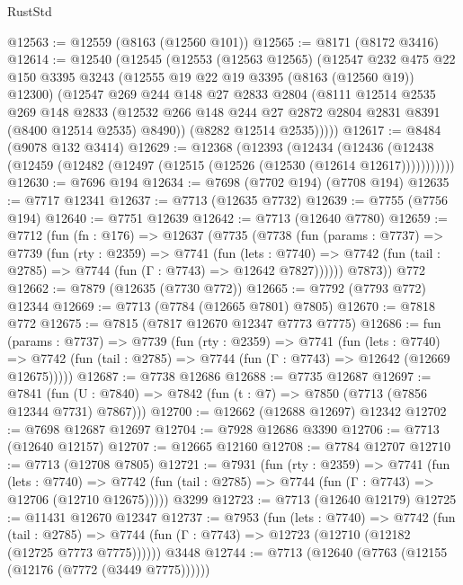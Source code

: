 \begin{lexlean}{RustStd}
\begin{coremodule}
@12563 := @12559 (@8163 (@12560 @101))
@12565 := @8171 (@8172 @3416)
@12614 := @12540
    (@12545
      (@12553
        (@12563 @12565)
        (@12547
          @232
          @475
          @22
          @150
          @3395
          @3243
          (@12555 @19 @22 @19 @3395 (@8163 (@12560 @19)) @12300)
          (@12547
            @269
            @244
            @148
            @27
            @2833
            @2804
            (@8111
              @12514
              @2535
              @269
              @148
              @2833
              (@12532 @266 @148 @244 @27 @2872 @2804 @2831 @8391 (@8400 @12514 @2535) @8490))
            (@8282 @12514 @2535)))))
@12617 := @8484 (@9078 @132 @3414)
@12629 := @12368
    (@12393
      (@12434
        (@12436 (@12438 (@12459 (@12482 (@12497 (@12515 (@12526 (@12530 (@12614 @12617)))))))))))
@12630 := @7696 @194
@12634 := @7698 (@7702 @194) (@7708 @194)
@12635 := @7717 @12341
@12637 := @7713 (@12635 @7732)
@12639 := @7755 (@7756 @194)
@12640 := @7751 @12639
@12642 := @7713 (@12640 @7780)
@12659 := @7712
    (fun (fn : @176) =>
    @12637
      (@7735
        (@7738
          (fun (params : @7737) =>
          @7739
            (fun (rty : @2359) =>
            @7741
              (fun (lets : @7740) =>
              @7742 (fun (tail : @2785) => @7744 (fun (Γ : @7743) => @12642 @7827))))))
        @7873))
    @772
@12662 := @7879 (@12635 (@7730 @772))
@12665 := @7792 (@7793 @772) @12344
@12669 := @7713 (@7784 (@12665 @7801) @7805)
@12670 := @7818 @772
@12675 := @7815 (@7817 @12670 @12347 @7773 @7775)
@12686 := fun (params : @7737) =>
  @7739
    (fun (rty : @2359) =>
    @7741
      (fun (lets : @7740) =>
      @7742 (fun (tail : @2785) => @7744 (fun (Γ : @7743) => @12642 (@12669 @12675)))))
@12687 := @7738 @12686
@12688 := @7735 @12687
@12697 := @7841
    (fun (U : @7840) => @7842 (fun (t : @7) => @7850 (@7713 (@7856 @12344 @7731) @7867)))
@12700 := @12662 (@12688 @12697) @12342
@12702 := @7698 @12687 @12697
@12704 := @7928 @12686 @3390
@12706 := @7713 (@12640 @12157)
@12707 := @12665 @12160
@12708 := @7784 @12707
@12710 := @7713 (@12708 @7805)
@12721 := @7931
    (fun (rty : @2359) =>
    @7741
      (fun (lets : @7740) =>
      @7742 (fun (tail : @2785) => @7744 (fun (Γ : @7743) => @12706 (@12710 @12675)))))
    @3299
@12723 := @7713 (@12640 @12179)
@12725 := @11431 @12670 @12347
@12737 := @7953
    (fun (lets : @7740) =>
    @7742
      (fun (tail : @2785) =>
      @7744 (fun (Γ : @7743) => @12723 (@12710 (@12182 (@12725 @7773 @7775))))))
    @3448
@12744 := @7713 (@12640 (@7763 (@12155 (@12176 (@7772 (@3449 @7775))))))

\end{coremodule}
\end{lexlean}
